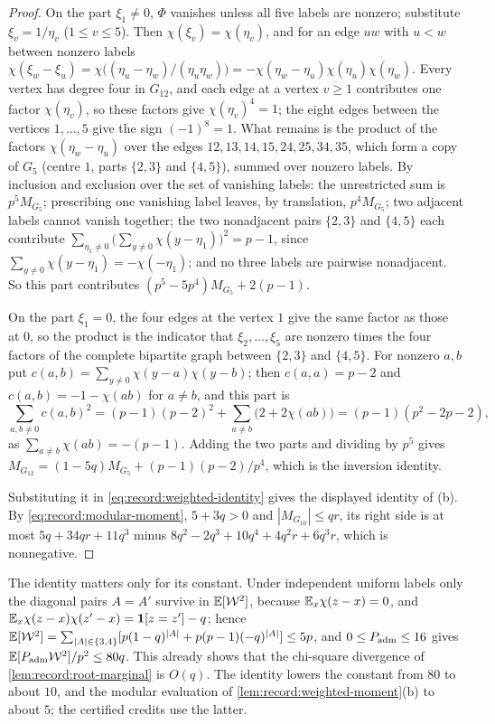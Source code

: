 \begin{proof}
On the part $\xi_1\ne0$, $\Phi$ vanishes unless all five labels are nonzero;
substitute $\xi_v=1/\eta_v$ ($1\le v\le5$). Then $\chi(\xi_v)=\chi(\eta_v)$, and for
an edge $uw$ with $u<w$ between nonzero labels
$\chi(\xi_w-\xi_u)=\chi\bigl((\eta_u-\eta_w)/(\eta_u\eta_w)\bigr)
=-\chi(\eta_w-\eta_u)\chi(\eta_u)\chi(\eta_w)$. Every vertex has degree four in
$G_{12}$, and each edge at a vertex $v\ge1$ contributes one factor $\chi(\eta_v)$,
so these factors give $\chi(\eta_v)^4=1$; the eight edges between the vertices
$1,\dots,5$ give the sign $(-1)^8=1$. What remains is the product of the factors
$\chi(\eta_w-\eta_u)$ over the edges $12,13,14,15,24,25,34,35$, which form a copy
of $G_5$ (centre $1$, parts $\{2,3\}$ and $\{4,5\}$), summed over nonzero labels.
By inclusion and exclusion over the set of vanishing labels: the unrestricted
sum is $p^5M_{G_5}$; prescribing one vanishing label leaves, by translation,
$p^4M_{G_5}$; two adjacent labels cannot vanish together; the two
nonadjacent pairs $\{2,3\}$ and $\{4,5\}$ each contribute
$\sum_{\eta_1\ne0}\bigl(\sum_{y\ne0}\chi(y-\eta_1)\bigr)^2=p-1$, since
$\sum_{y\ne0}\chi(y-\eta_1)=-\chi(-\eta_1)$; and no three labels are pairwise
nonadjacent. So this part contributes $(p^5-5p^4)M_{G_5}+2(p-1)$.

On the part $\xi_1=0$, the four edges at the vertex $1$ give the same factor as
those at $0$, so the product is the indicator that $\xi_2,\dots,\xi_5$ are
nonzero times the four factors of the complete bipartite graph between
$\{2,3\}$ and $\{4,5\}$. For nonzero $a,b$ put
$c(a,b)=\sum_{y\ne0}\chi(y-a)\chi(y-b)$; then $c(a,a)=p-2$ and
$c(a,b)=-1-\chi(ab)$ for $a\ne b$, and this part is
\[
 \sum_{a,b\ne0}c(a,b)^2=(p-1)(p-2)^2+\sum_{a\ne b}\bigl(2+2\chi(ab)\bigr)
 =(p-1)(p^2-2p-2),
\]
as $\sum_{a\ne b}\chi(ab)=-(p-1)$. Adding the two parts and dividing by $p^5$
gives $M_{G_{12}}=(1-5q)M_{G_5}+(p-1)(p-2)/p^4$, which is the inversion identity.

Substituting it in \eqref{eq:record:weighted-identity} gives the displayed
identity of (b). By \eqref{eq:record:modular-moment}, $5+3q>0$ and
$|M_{G_{10}}|\le qr$, its right side is at most $5q+34qr+11q^3$ minus
$8q^2-2q^3+10q^4+4q^2r+6q^3r$, which is nonnegative.
\end{proof}

\begin{remark}\label{rem:variance:crude}
The identity matters only for its constant. Under independent uniform labels
only the diagonal pairs $A=A'$ survive in $\mathbb E[\mathcal W^2]$, because
$\mathbb E_x\chi(z-x)=0$, and $\mathbb E_x\chi(z-x)\chi(z'-x)=\mathbf 1[z=z']-q$; hence
$\mathbb E[\mathcal W^2]=\sum_{|A|\in\{3,4\}}[p(1-q)^{|A|}+p(p-1)(-q)^{|A|}]\le5p$, and
$0\le P_{\rm adm}\le16$ gives $\mathbb E[P_{\rm adm}\mathcal W^2]/p^2\le80q$. This
already shows that the chi-square divergence of \cref{lem:record:root-marginal}
is $O(q)$. The identity lowers the constant from $80$ to about $10$, and the
modular evaluation of \cref{lem:record:weighted-moment}(b) to about $5$; the
certified credits use the latter.
\end{remark}

